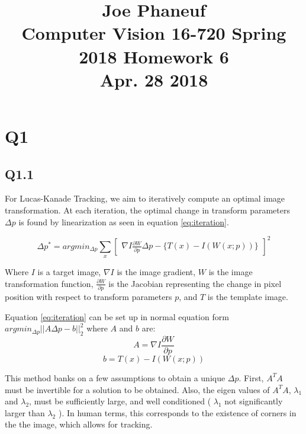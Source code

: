 \documentclass[12pt]{article}
\begin{document}
\title{Joe Phaneuf \\ Computer Vision 16-720 Spring 2018 Homework 6 \\ Apr. 28 2018 }
\date{}
\author{}
\maketitle

\newpage


\section{Q1}
\subsection{Q1.1}
For Lucas-Kanade Tracking, we aim to iteratively compute an optimal image transformation. At each iteration, the optimal change in transform parameters $\Delta p$ is found by linearization as seen in equation \ref{eq:iteration}.

\begin{equation}
\label{eq:iteration}
\Delta p ^{*} = argmin_{\Delta p} \sum_{x}
\begin{bmatrix}
\nabla I \frac { \partial W } { \partial p } \Delta p - \{ T ( x ) - I ( W ( x ; p ) ) \}
\end{bmatrix}^{2}
\end{equation}

Where $I$ is a target image, $\nabla I$ is the image gradient, $W$ is the image transformation function, $\frac{ \partial W } { \partial p }$ is the Jacobian representing the change in pixel position with respect to transform parameters $p$, and $T$ is the template image.

Equation \ref{eq:iteration} can be set up in normal equation form $argmin_{\Delta p} || A \Delta p - b ||_{2}^{2}$ where $A$ and $b$ are:
\begin{equation}
\label{eq:A}
A =
\nabla I \frac { \partial W } { \partial p }
\end{equation}
\begin{equation}
\label{eq:A}
b = T ( x ) - I ( W ( x ; p ) )
\end{equation}

This method banks on a few assumptions to obtain a unique $\Delta p$. First, $A^{T} A$ must be invertible for a solution to be obtained. Also, the eigen values of $A^{T} A$, $\lambda_{1}$ and $\lambda_{2}$, must be sufficiently large, and well conditioned ( $\lambda_{1}$ not significantly larger than $\lambda_{2}$ ). In human terms, this corresponds to the existence of corners in the the image, which allows for tracking.
\end{document}
